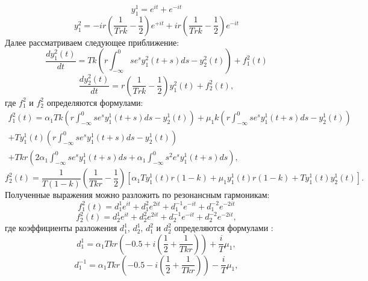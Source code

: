 \documentclass[12pt]{article}
\begin{document}
 \begin{equation*}
    y_1^1= e^{i t}+ e^{-i t}
 \end{equation*}
 \begin{equation*}
    y_1^2=-i r \left(  \frac{1}{T r k} - \frac{1}{2}\right) e^{+i t}+ i r \left(  \frac{1}{T r k} - \frac{1}{2}\right) e^{-i t}
 \end{equation*}
 Далее рассматриваем следующее приближение:
\begin{equation}\label{s2}
       \frac{d y^2_1(t)}{d t}=T k (r \int_{-\infty}^{0} s e^{s}y^2_1(t+s)d s -  y^2_2 (t) ) + f^2_1 (t)
   \end{equation}
   \begin{equation*}
   \frac{d y^2_2(t)}{d t}= r(\frac{1}{T r k} -\frac{1}{2})y^2_1(t)+f^2_2 (t) ,
\end{equation*}
где $ f^2_1 $ и $f^2_2$ определяются формулами:
\begin{multline}
    f^2_1 (t)=\alpha_1 T k \left( r \int_{-\infty}^{0} s e^{s} y^1_1 (t+s) d s - y^1_2 (t) \right)+\mu_1 k \left( r \int_{-\infty}^{0} s e^{s} y^1_1 (t+s) d s - y^1_2 (t) \right)\\ +T y^1_1 (t) \left( r \int_{-\infty}^{0} s e^{s} y^1_1 (t+s) d s - y^1_2 (t) \right) \\+T k r \left(  2  \alpha_1 \int_{-\infty}^{0} s e^{s} y^1_1 (t+s)d s +  \alpha_1 \int_{-\infty}^{0}s^2 e^{s} y^1_1(t+s) d s     \right) ,
    \end{multline}
    \begin{equation*}
    f^2_2(t)=\frac{1}{T (1-k)}\left( \frac{1}{T k r} - \frac{1}{2} \right)\left[ \alpha_1 T y^1_1(t)r(1-k)+\mu_1 y^1_1 (t)r(1-k) + T y^1_1(t) y^1_2(t)       \right].
    \end{equation*}
Полученные выражения можно разложить по резонансным гармоникам:
 \begin{equation}
      f^2_1(t)=d^1_1 e^{i t}+d^2_1 e^{2 i t} +d^{-1}_1e^{-i t}+d^{-2}_1 e^{-2 i t}
    \end{equation}
    \begin{equation*}
      f^2_2(t)=d^1_2 e^{i t}+d^2_2 e^{2 i t} +d^{-1}_2e^{-i t}+d^{-2}_2 e^{-2 i t},
    \end{equation*}
где коэффициенты разложения $ d^1_1 $, $ d^1_2 $, $ d^2_1$ и $d^2_2$ определяются формулами :
\begin{equation*}
    d^1_1=\alpha_1 T k r \left ( -0.5+i(\frac{1}{2}+\frac{1}{T k r}) \right)+\frac{i}{T} \mu_1,
\end{equation*}
\begin{equation*}
    d^{-1}_1=\alpha_1 T k r \left ( -0.5-i(\frac{1}{2}+\frac{1}{T k r}) \right)-\frac{i}{T} \mu_1,
\end{equation*}
\end{document}
